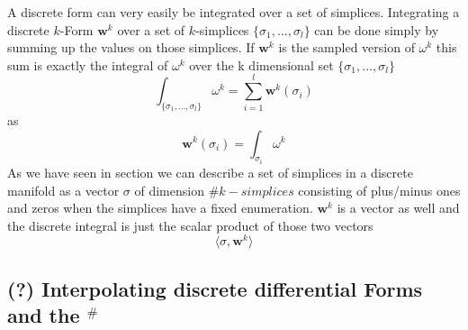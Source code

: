 A discrete form can very easily be integrated over a set of simplices. Integrating a discrete $k$-Form $\textbf{w}^k$ over a set of $k$-simplices $\{\sigma_1,...,\sigma_l\}$ can be done simply by summing up the values on those simplices. If $\textbf{w}^k$ is the sampled version of $\omega^k$ this sum is exactly the integral of $\omega^k$  over the k dimensional set $\{\sigma_1,...,\sigma_l\}$
\[\int_{\{\sigma_1,...,\sigma_l\}} \omega^k = \sum_{i=1}^l \textbf{w}^k(\sigma_i)\]
as
\[\textbf{w}^k(\sigma_i) = \int_{\sigma_i} \omega^k\]
As we have seen in section  we can describe a set of simplices in a discrete manifold as a vector $\sigma$ of dimension $\# k-simplices$ consisting of plus/minus ones and zeros when the simplices have a fixed enumeration. $\textbf{w}^k$ is a vector as well and the discrete integral is just the scalar product of those two vectors
$$\langle \sigma , \textbf{w}^k \rangle$$

\subsection{(?) Interpolating discrete differential Forms and the $^\#$ }
